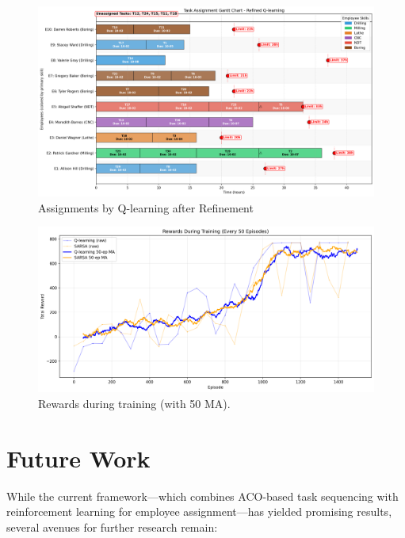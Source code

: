 \documentclass[%
aip,
cp,  %
amsmath,amssymb,
reprint,%
]{revtex4-2}
\begin{document}
	\begin{figure}[H]
		\centering
		\includegraphics[width=1\textwidth]{figures/gantt_q_after.png}
		\caption{\label{fig:q_learning}Assignments by Q-learning after Refinement}
	\end{figure}
	
	\begin{figure}[H]
		\centering
		\includegraphics[width=1\textwidth]{figures/rewards_history.png}
		\caption{\label{fig:rewards_training}Rewards during training (with 50 MA).}
	\end{figure}
	
	\section{\label{sec:future}Future Work}
	
	While the current framework—which combines ACO-based task sequencing with
	reinforcement learning for employee assignment—has yielded promising results, several
	avenues for further research remain:
	
\end{document}
